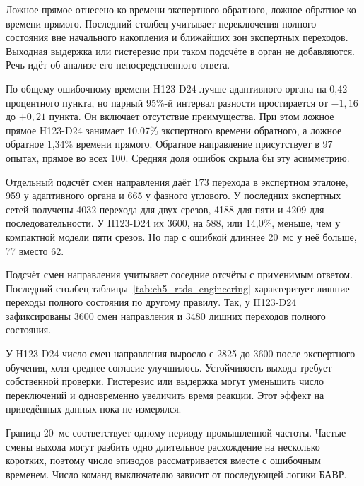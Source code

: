 Ложное прямое отнесено ко времени экспертного обратного,
ложное обратное ко времени прямого.
Последний столбец учитывает переключения полного состояния
вне начального накопления и ближайших зон экспертных переходов.
Выходная выдержка или гистерезис при таком подсчёте
в орган не добавляются.
Речь идёт об анализе его непосредственного ответа.

По общему ошибочному времени H123-D24
лучше адаптивного органа на 0,42 процентного пункта,
но парный 95\%-й интервал разности
простирается от $-1{,}16$ до $+0{,}21$ пункта.
Он включает отсутствие преимущества.
При этом ложное прямое H123-D24 занимает 10,07\%
экспертного времени обратного,
а ложное обратное 1,34\% времени прямого.
Обратное направление присутствует в 97 опытах,
прямое во всех 100.
Средняя доля ошибок скрыла бы эту асимметрию.

Отдельный подсчёт смен направления
даёт 173 перехода в экспертном эталоне,
959 у адаптивного органа и 665 у фазного углового.
У последних экспертных сетей получены
4032 перехода для двух срезов,
4188 для пяти и 4209 для последовательности.
У H123-D24 их 3600,
на 588, или 14,0\%, меньше,
чем у компактной модели пяти срезов.
Но пар с ошибкой длиннее 20~мс
у неё больше, 77 вместо 62.

Подсчёт смен направления учитывает соседние отсчёты с применимым ответом. Последний
столбец таблицы~\ref{tab:ch5_rtds_engineering} характеризует лишние переходы полного
состояния по другому правилу. Так, у H123-D24 зафиксированы 3600 смен направления и 3480
лишних переходов полного состояния.

У H123-D24 число смен направления выросло с 2825 до 3600 после экспертного обучения,
хотя среднее согласие улучшилось. Устойчивость выхода требует собственной проверки.
Гистерезис или выдержка могут уменьшить число переключений и одновременно увеличить
время реакции. Этот эффект на приведённых данных пока не измерялся.

Граница 20~мс соответствует одному периоду промышленной частоты. Частые смены выхода
могут разбить одно длительное расхождение на несколько коротких, поэтому число эпизодов
рассматривается вместе с ошибочным временем. Число команд выключателю зависит от
последующей логики БАВР.

